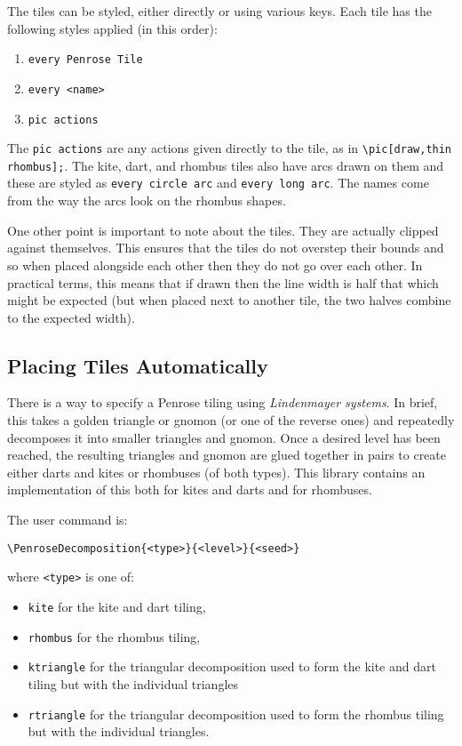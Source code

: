 \documentclass{ltxdoc}
\begin{document}
The tiles can be styled, either directly or using various keys.
Each tile has the following styles applied (in this order):
%
\begin{enumerate}
\item \Verb+every Penrose Tile+
\item \Verb+every <name>+
\item \Verb+pic actions+
\end{enumerate}
%
The \Verb+pic actions+ are any actions given directly to the tile, as in \Verb+\pic[draw,thin rhombus];+.
The kite, dart, and rhombus tiles also have arcs drawn on them and these are styled as \Verb+every circle arc+ and \Verb+every long arc+.
The names come from the way the arcs look on the rhombus shapes.

One other point is important to note about the tiles.
They are actually clipped against themselves.
This ensures that the tiles do not overstep their bounds and so when placed alongside each other then they do not go over each other.
In practical terms, this means that if drawn then the line width is half that which might be expected (but when placed next to another tile, the two halves combine to the expected width).

\subsection{Placing Tiles Automatically}

There is a way to specify a Penrose tiling using \emph{Lindenmayer systems}.
In brief, this takes a golden triangle or gnomon (or one of the reverse ones) and repeatedly decomposes it into smaller triangles and gnomon.
Once a desired level has been reached, the resulting triangles and gnomon are glued together in pairs to create either darts and kites or rhombuses (of both types).
This library contains an implementation of this both for kites and darts and for rhombuses.

The user command is:
%
\begin{verbatim}
\PenroseDecomposition{<type>}{<level>}{<seed>}
\end{verbatim}
%
where \Verb+<type>+ is one of:
%
\begin{itemize}
\item \Verb+kite+ for the kite and dart tiling,
\item \Verb+rhombus+ for the rhombus tiling,
\item \Verb+ktriangle+ for the triangular decomposition used to form the kite and dart tiling but with the individual triangles
\item \Verb+rtriangle+ for the triangular decomposition used to form the rhombus tiling but with the individual triangles.
\end{itemize}
\end{document}
